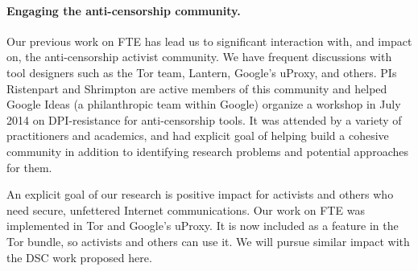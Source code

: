 

\paragraph{Engaging the anti-censorship community.} Our previous work on FTE has
lead us to significant interaction with, and impact on, the anti-censorship
activist community. We have frequent discussions with tool designers 
such as the Tor team, Lantern, Google's uProxy, and others. PIs Ristenpart and
Shrimpton are active members of this community and helped Google Ideas (a
philanthropic team within Google) organize a workshop in July 2014 on DPI-resistance
for anti-censorship tools. It was attended by a variety of practitioners
and academics, and had explicit goal of helping build a cohesive community in
addition to identifying research problems and potential approaches for them.

An explicit goal of our research is positive impact for activists and others who
need secure, unfettered Internet communications. Our work on FTE was
implemented in Tor and Google's uProxy. It is now included as a feature in
the Tor bundle, so activists and others can use it. 
We will pursue similar impact with the DSC work proposed here.



